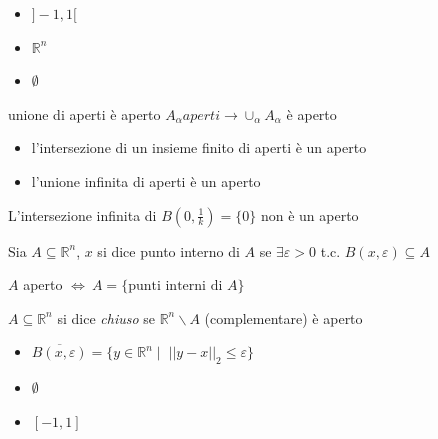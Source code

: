 \begin{example}
  \begin{itemize}
  \item  $ ] -1, 1 [$
  \item $\mathbb{R}^{n}$
  \item $\emptyset$
  \end{itemize}
\end{example}

\begin{property}
 unione di aperti è aperto
  $A_{\alpha} aperti \rightarrow \cup_{\alpha} A_{\alpha}$ è aperto
\end{property}

\begin{property}
\begin{itemize}
\item l'intersezione di un insieme finito di aperti è  un aperto
\item l'unione infinita di aperti è un aperto
\end{itemize}

\end{property}
L'intersezione infinita di $B(0, \frac{1}{k}) = \{0\}$ non è un aperto

\begin{defn}
Sia $ A \subseteq \mathbb{R}^n$, $x$ si dice punto interno di $A$ se
$\exists \varepsilon > 0$ t.c. $B(x, \varepsilon) \subseteq A $
\end{defn}

\begin{property}
 $A$ aperto $\Longleftrightarrow ~ A=\{ \text{punti interni di  } A \}$
\end{property}

\begin{defn}[Chiuso]
$A \subseteq \mathbb{R}^{n}$ si dice \emph{chiuso} se
 $\mathbb{R}^{n} \backslash A$ (complementare) è aperto
\end{defn}

\begin{example}
  \begin{itemize}
  \item $ \overline{B(x, \varepsilon) } = \{ y \in \mathbb{R}^{n} \; | \;\;  ||y-x||_{2} \leq \varepsilon \}$
  \item $\emptyset$
  \item $[-1,1]$
  \end{itemize}
\end{example}

